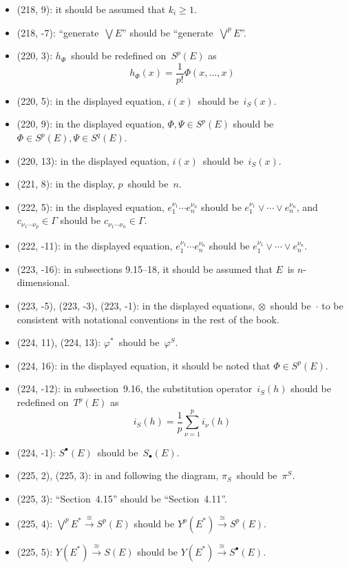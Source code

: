 \documentclass[letterpaper,12pt]{article}
\newcommand{\iso}{\cong}
\newcommand{\mult}{\cdot}
\newcommand{\tprod}{\otimes}
\newcommand{\smprod}{\vee}
\newcommand{\bigsmprod}{\bigvee}
\begin{document}
\begin{itemize}
\item (218, 9): it should be assumed that \(k_i\ge 1\).
\item (218, -7): ``generate~\(\bigsmprod E\)'' should be ``generate~\(\bigsmprod^p E\)''.
\item (220, 3): \(h_{\Phi}\)~should be redefined on~\(S^p(E)\) as
\[h_{\Phi}(x)=\frac{1}{p!}\Phi(x,\ldots,x)\]
\item (220, 5): in the displayed equation, \(i(x)\)~should be~\(i_S(x)\).
\item (220, 9): in the displayed equation, \(\Phi,\Psi\in S^p(E)\) should be \(\Phi\in S^p(E),\Psi\in S^q(E)\).
\item (220, 13): in the displayed equation, \(i(x)\)~should be~\(i_S(x)\).
\item (221, 8): in the display, \(p\)~should be~\(n\).
\item (222, 5): in the displayed equation, \(e_1^{\nu_1}\cdots e_n^{\nu_n}\) should be \(e_1^{\nu_1}\smprod\cdots\smprod e_n^{\nu_n}\), and \(c_{\nu_1\cdots\nu_p}\in\Gamma\) should be \(c_{\nu_1\cdots\nu_n}\in\Gamma\).
\item (222, -11): in the displayed equation, \(e_1^{\nu_1}\cdots e_n^{\nu_n}\) should be \(e_1^{\nu_1}\smprod\cdots\smprod e_n^{\nu_n}\).
\item (223, -16): in subsections 9.15--18, it should be assumed that \(E\)~is \(n\)-dimensional.
\item (223, -5), (223, -3), (223, -1): in the displayed equations, \(\tprod\)~should be~\(\mult\) to be consistent with notational conventions in the rest of the book.
\item (224, 11), (224, 13): \(\varphi^*\)~should be~\(\varphi^S\).
\item (224, 16): in the displayed equation, it should be noted that \(\Phi\in S^p(E)\).
\item (224, -12): in subsection~9.16, the substitution operator~\(i_S(h)\) should be redefined on~\(T^p(E)\) as
\[i_S(h)=\frac{1}{p}\sum_{\nu=1}^p i_{\nu}(h)\]
\item (224, -1): \(S^{\bullet}(E)\)~should be~\(S_{\bullet}(E)\).
\item (225, 2), (225, 3): in and following the diagram, \(\pi_S\)~should be~\(\pi^S\).
\item (225, 3): ``Section~4.15'' should be ``Section~4.11''.
\item (225, 4): \(\bigsmprod^p E^*\stackrel{\iso}{\to}S^p(E)\) should be \(Y^p(E^*)\stackrel{\iso}{\to}S^p(E)\).
\item (225, 5): \(Y(E^*)\stackrel{\iso}{\to}S(E)\) should be \(Y(E^*)\stackrel{\iso}{\to}S^{\bullet}(E)\).

\end{itemize}
\end{document}
